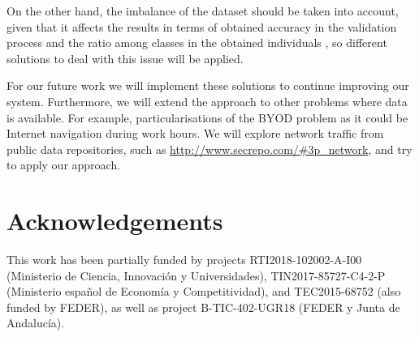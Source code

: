 \documentclass[runningheads]{llncs}
\begin{document}
On the other hand, the imbalance of the dataset should be taken into
account, given that it affects the results in terms of obtained
accuracy in the validation process and the ratio among classes in the
obtained individuals \cite{Pereira19RuleExtractionProblems}, so different solutions to deal with this issue will be applied. 

For our future work we will implement these solutions to continue
improving our system. Furthermore, we will extend the approach to other problems where data is available. For example, particularisations of the BYOD problem as it could be Internet navigation during work hours. We will explore network traffic from public data repositories, such as \url{http://www.secrepo.com/#3p_network}, and try to apply our approach. 

\section{Acknowledgements}

This work has been partially funded by projects RTI2018-102002-A-I00 (Ministerio de Ciencia, Innovaci\'on y Universidades), TIN2017-85727-C4-2-P (Ministerio espa\~nol de Econom\'ia y Competitividad), and TEC2015-68752 (also funded by FEDER), as well as project B-TIC-402-UGR18 (FEDER y Junta de Andaluc\'ia).

      
   
\end{document}
